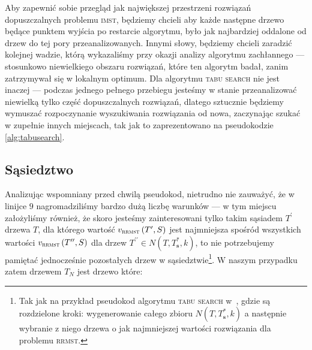 Aby zapewnić sobie przegląd jak największej przestrzeni rozwiązań dopuszczalnych problemu \textsc{imst}, będziemy chcieli aby każde następne drzewo będące punktem wyjścia po restarcie algorytmu, było jak najbardziej oddalone od drzew do tej pory przeanalizowanych. Innymi słowy, będziemy chcieli zaradzić kolejnej wadzie, którą wykazaliśmy przy okazji analizy algorytmu zachłannego --- stosunkowo niewielkiego obszaru rozwiązań, które ten algorytm badał, zanim zatrzymywał się w lokalnym optimum. Dla algorytmu \textsc{tabu search} nie jest inaczej --- podczas jednego pełnego przebiegu jesteśmy w stanie przeanalizować niewielką tylko część dopuszczalnych rozwiązań, dlatego sztucznie będziemy wymuszać rozpoczynanie wyszukiwania rozwiązania od nowa, zaczynając szukać w zupełnie innych miejscach, tak jak to zaprezentowano na pseudokodzie \ref{alg:tabusearch}.

\subsection{Sąsiedztwo}

Analizując wspomniany przed chwilą pseudokod, nietrudno nie zauważyć, że w linijce $9$ nagromadziliśmy bardzo dużą liczbę warunków --- w tym miejscu założyliśmy również, że skoro jesteśmy zainteresowani tylko takim sąsiadem $T^{\prime}$ drzewa $T$, dla którego wartość $v_{\textsc{rrmst}} \left( T^{\prime}, S \right)$ jest najmniejsza spośród wszystkich wartości $v_{\textsc{rrmst}} \left( T^{\prime\prime}, S \right)$ dla drzew $T^{\prime\prime} \in N \left( T, T^{\ast}_{\textbf{s}}, k \right)$, to nie potrzebujemy pamiętać jednocześnie pozostałych drzew w sąsiedztwie\footnote{Tak jak na przykład pseudokod algorytmu \textsc{tabu search} w~\cite{Kasperski2012}, gdzie są rozdzielone kroki: wygenerowanie całego zbioru $N \left( T, T^{\ast}_{\textbf{s}}, k \right)$ a następnie wybranie z niego drzewa o jak najmniejszej wartości rozwiązania dla problemu \textsc{rrmst}.}. W naszym przypadku zatem drzewem $T_{N}$ jest drzewo które:

